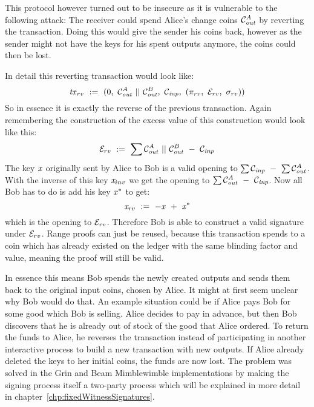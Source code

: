 This protocol however turned out to be insecure as it is vulnerable to the following attack:
The receiver could spend Alice's change coins $\mathcal{C}_{\mathit{out}}^A$ by reverting the transaction.
Doing this would give the sender his coins back, however as the sender might not have the keys for his spent outputs anymore, the coins could then be lost.

In detail this reverting transaction would look like:
\[ \mathit{tx}_{rv} ~:=~ (0 ,~ \mathcal{C}_{\mathit{out}}^A ~||~ \mathcal{C}_{\mathit{out}}^B ,~ \mathcal{C}_{\mathit{inp}} ,~ (\pi_{rv} ,~ \mathcal{E}_{rv} ,~ \sigma_{rv}) ) \]
So in essence it is exactly the reverse of the previous transaction.
Again remembering the construction of the excess value of this construction would look like this:
\[ \mathcal{E}_{rv} ~:=~ \sum{\mathcal{C}_{\mathit{out}}^A ~||~\mathcal{C}_{\mathit{out}}^B ~-~\mathcal{C}_{\mathit{inp}}} \]
The key $\mathit{x}$ originally sent by Alice to Bob is a valid opening to $\sum{\mathcal{C}_{\mathit{inp}}} ~-~ \sum{\mathcal{C}_{\mathit{out}}^A}$. With the inverse of this key $\mathit{x}_{inv}$ we get the opening to $\sum{\mathcal{C}_{\mathit{out}}^A ~-~\mathcal{C}_{\mathit{inp}}}$.
Now all Bob has to do is add his key $\mathit{x}^*$ to get:
\[ \mathit{x}_{rv} ~:=~ -\mathit{x} ~+~ \mathit{x}^* \]
which is the opening to $\mathcal{E}_{rv}$.
Therefore Bob is able to construct a valid signature under $\mathcal{E}_{rv}$.
Range proofs can just be reused, because this transaction spends to a coin which has already existed on the ledger with the same blinding factor and value, meaning the proof will still be valid.

In essence this means Bob spends the newly created outputs and sends them back to the original input coins, chosen by Alice. It might at first seem unclear why Bob would do that.
An example situation could be if Alice pays Bob for some good which Bob is selling. Alice decides to pay in advance, but then Bob discovers that he is already out of stock of the good that Alice ordered.
To return the funds to Alice, he reverses the transaction instead of participating in another interactive process to build a new transaction with new outputs.
If Alice already deleted the keys to her initial coins, the funds are now lost.
The problem was solved in the Grin and Beam Mimblewimble implementations by making the signing process itself a two-party process which will be explained in more detail in chapter~\ref{chp:fixedWitnessSignatures}.


